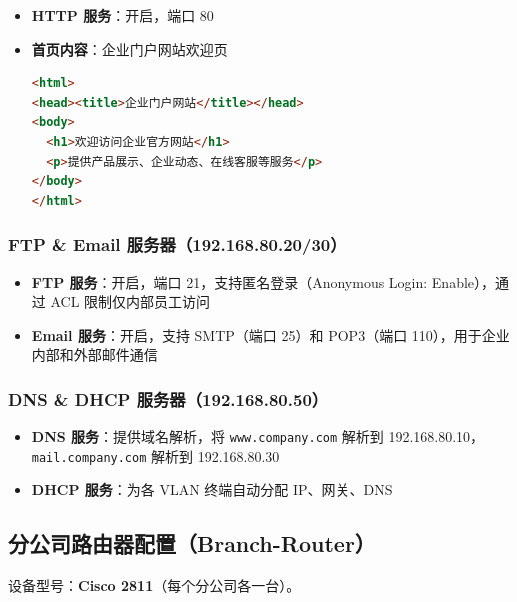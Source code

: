 \documentclass[12pt,a4paper]{ctexart}
\begin{document}
\begin{itemize}
    \item \textbf{HTTP 服务}：开启，端口 80
    \item \textbf{首页内容}：企业门户网站欢迎页
\begin{lstlisting}[language=HTML]
<html>
<head><title>企业门户网站</title></head>
<body>
  <h1>欢迎访问企业官方网站</h1>
  <p>提供产品展示、企业动态、在线客服等服务</p>
</body>
</html>
\end{lstlisting}
\end{itemize}

\subsubsection{FTP \& Email 服务器（192.168.80.20/30）}

\begin{itemize}
    \item \textbf{FTP 服务}：开启，端口 21，支持匿名登录（Anonymous Login: Enable），通过 ACL 限制仅内部员工访问
    \item \textbf{Email 服务}：开启，支持 SMTP（端口 25）和 POP3（端口 110），用于企业内部和外部邮件通信
\end{itemize}

\subsubsection{DNS \& DHCP 服务器（192.168.80.50）}

\begin{itemize}
    \item \textbf{DNS 服务}：提供域名解析，将 \texttt{www.company.com} 解析到 192.168.80.10，\texttt{mail.company.com} 解析到 192.168.80.30
    \item \textbf{DHCP 服务}：为各 VLAN 终端自动分配 IP、网关、DNS
\end{itemize}

\subsection{分公司路由器配置（Branch-Router）}

设备型号：\textbf{Cisco 2811}（每个分公司各一台）。
\end{document}
